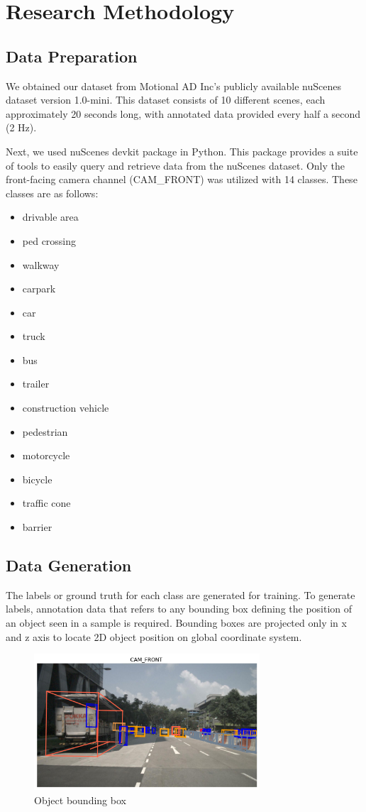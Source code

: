 \chapter{Research Methodology}

\section{Data Preparation}

We obtained our dataset from Motional AD Inc's publicly available nuScenes dataset version 1.0-mini. This dataset consists of 10 different scenes,
each approximately 20 seconds long, with annotated data provided every half a second (2 Hz).

Next, we used nuScenes devkit package in Python. This package provides a suite of tools to 
easily query and retrieve data from the nuScenes dataset. Only the front-facing camera channel (CAM\_FRONT) was utilized
with 14 classes. These classes are as follows:
\begin{itemize}
  \item drivable area
  \item ped crossing
  \item walkway
  \item carpark
  \item car
  \item truck
  \item bus
  \item trailer
  \item construction vehicle
  \item pedestrian
  \item motorcycle
  \item bicycle
  \item traffic cone
  \item barrier
\end{itemize}


\section{Data Generation}
The labels or ground truth for each class are generated for training.
To generate labels, annotation data that refers to any bounding box defining the position of an object seen in a sample is required. Bounding boxes are projected only in x and z axis to locate 2D object position on global coordinate system.


\begin{figure}[h]
  \centering
  \includegraphics[width=0.75\textwidth]{img/3-bounding-box.png}
  \caption{Object bounding box}
  \label{fig:example1}
\end{figure}

